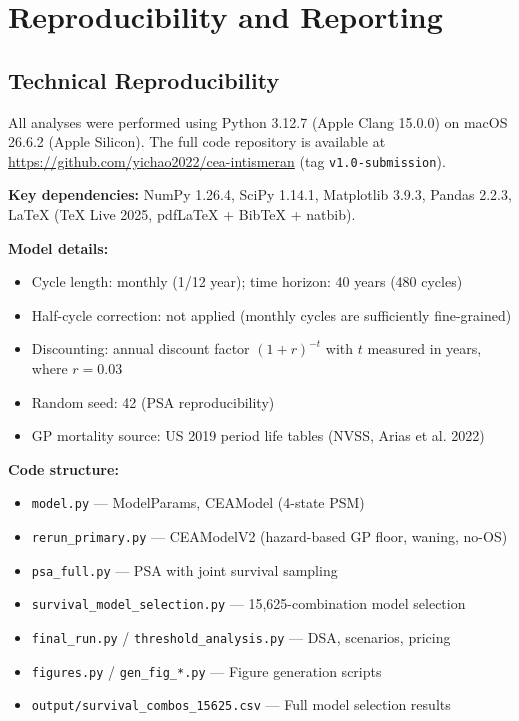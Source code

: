 \documentclass[11pt,a4paper]{article}
\begin{document}
\section{Reproducibility and Reporting}

\subsection{Technical Reproducibility}
\label{sec:tech_repro}
All analyses were performed using Python 3.12.7 (Apple Clang 15.0.0) on macOS 26.6.2 (Apple Silicon). The full code repository is available at \url{https://github.com/yichao2022/cea-intismeran} (tag \texttt{v1.0-submission}).

\textbf{Key dependencies:} NumPy 1.26.4, SciPy 1.14.1, Matplotlib 3.9.3, Pandas 2.2.3, LaTeX (TeX Live 2025, pdfLaTeX + BibTeX + natbib).

\textbf{Model details:}
\begin{itemize}
    \item Cycle length: monthly (1/12 year); time horizon: 40 years (480 cycles)
    \item Half-cycle correction: not applied (monthly cycles are sufficiently fine-grained)
    \item Discounting: annual discount factor $(1+r)^{-t}$ with $t$ measured in years, where $r = 0.03$
    \item Random seed: 42 (PSA reproducibility)
    \item GP mortality source: US 2019 period life tables (NVSS, Arias et al. 2022)
\end{itemize}

\textbf{Code structure:}
\begin{itemize}
    \item \texttt{model.py} --- ModelParams, CEAModel (4-state PSM)
    \item \texttt{rerun\_primary.py} --- CEAModelV2 (hazard-based GP floor, waning, no-OS)
    \item \texttt{psa\_full.py} --- PSA with joint survival sampling
    \item \texttt{survival\_model\_selection.py} --- 15,625-combination model selection
    \item \texttt{final\_run.py} / \texttt{threshold\_analysis.py} --- DSA, scenarios, pricing
    \item \texttt{figures.py} / \texttt{gen\_fig\_*.py} --- Figure generation scripts
    \item \texttt{output/survival\_combos\_15625.csv} --- Full model selection results
\end{itemize}
\end{document}
